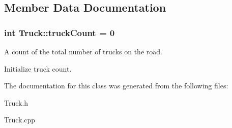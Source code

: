 \subsection{Member Data Documentation}
\subsubsection[{\texorpdfstring{truck\+Count}{truckCount}}]{\setlength{\rightskip}{0pt plus 5cm}int Truck\+::truck\+Count = 0\hspace{0.3cm}{\ttfamily [static]}}\hypertarget{classTruck_a7435e6c1e97d263f36897f8ade5d4c41}{}\label{classTruck_a7435e6c1e97d263f36897f8ade5d4c41}


A count of the total number of trucks on the road. 

Initialize truck count. 

The documentation for this class was generated from the following files\+:\begin{DoxyCompactItemize}
\item 
Truck.\+h\item 
Truck.\+cpp\end{DoxyCompactItemize}
